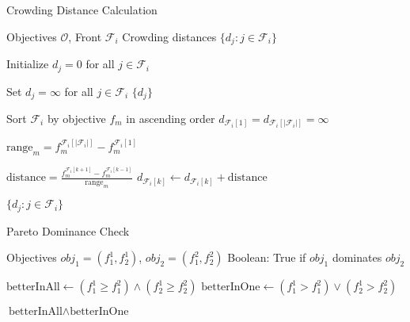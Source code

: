 \documentclass{article}
\begin{document}
\begin{algorithm}
\caption{Crowding Distance Calculation}
\label{alg:crowding-dist}
\begin{algorithmic}[1]
\REQUIRE Objectives $\mathcal{O}$, Front $\mathcal{F}_i$
\ENSURE Crowding distances $\{d_j : j \in \mathcal{F}_i\}$

\STATE Initialize $d_j = 0$ for all $j \in \mathcal{F}_i$

    \STATE Set $d_j = \infty$ for all $j \in \mathcal{F}_i$
    \RETURN $\{d_j\}$
\ENDIF

 
    \STATE Sort $\mathcal{F}_i$ by objective $f_m$ in ascending order
    \STATE $d_{\mathcal{F}_i[1]} = d_{\mathcal{F}_i[|\mathcal{F}_i|]} = \infty$ 
    
    \STATE $\text{range}_m = f_m^{\mathcal{F}_i[|\mathcal{F}_i|]} - f_m^{\mathcal{F}_i[1]}$ 
    
            \STATE $\text{distance} = \frac{f_m^{\mathcal{F}_i[k+1]} - f_m^{\mathcal{F}_i[k-1]}}{\text{range}_m}$
            \STATE $d_{\mathcal{F}_i[k]} \leftarrow d_{\mathcal{F}_i[k]} + \text{distance}$
        \ENDFOR
    \ENDIF
\ENDFOR

\RETURN $\{d_j : j \in \mathcal{F}_i\}$

\end{algorithmic}
\end{algorithm}

\vspace{1em}

\begin{algorithm}
\caption{Pareto Dominance Check}
\label{alg:dominance}
\begin{algorithmic}[1]
\REQUIRE Objectives $obj_1 = (f_1^1, f_2^1)$, $obj_2 = (f_1^2, f_2^2)$
\ENSURE Boolean: True if $obj_1$ dominates $obj_2$

\STATE $\text{betterInAll} \leftarrow (f_1^1 \geq f_1^2) \land (f_2^1 \geq f_2^2)$ 
\STATE $\text{betterInOne} \leftarrow (f_1^1 > f_1^2) \lor (f_2^1 > f_2^2)$ 

\RETURN $\text{betterInAll} \land \text{betterInOne}$

\end{algorithmic}
\end{algorithm}
\end{document}
